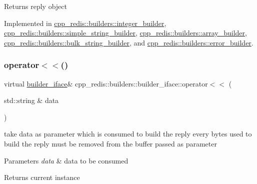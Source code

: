 \begin{DoxyReturn}{Returns}
reply object 
\end{DoxyReturn}


Implemented in \hyperlink{classcpp__redis_1_1builders_1_1integer__builder_a25221763ba6f8b740458c673945208e0}{cpp\+\_\+redis\+::builders\+::integer\+\_\+builder}, \hyperlink{classcpp__redis_1_1builders_1_1simple__string__builder_a24ad0968d7d02172a65cf8982c540d51}{cpp\+\_\+redis\+::builders\+::simple\+\_\+string\+\_\+builder}, \hyperlink{classcpp__redis_1_1builders_1_1array__builder_ac5c805ad87b357a9578c5a0d479109b3}{cpp\+\_\+redis\+::builders\+::array\+\_\+builder}, \hyperlink{classcpp__redis_1_1builders_1_1bulk__string__builder_a56d6d3089107a1bccd63f6a5267c16cb}{cpp\+\_\+redis\+::builders\+::bulk\+\_\+string\+\_\+builder}, and \hyperlink{classcpp__redis_1_1builders_1_1error__builder_ae2b68b7daad4d71b6780e47bdcc1e32b}{cpp\+\_\+redis\+::builders\+::error\+\_\+builder}.

\mbox{\label{classcpp__redis_1_1builders_1_1builder__iface_a9892bbc9c887c31c2742dad4476e2fa6}} 
\subsubsection{\texorpdfstring{operator$<$$<$()}{operator<<()}}
{\footnotesize\ttfamily virtual \hyperlink{classcpp__redis_1_1builders_1_1builder__iface}{builder\+\_\+iface}\& cpp\+\_\+redis\+::builders\+::builder\+\_\+iface\+::operator$<$$<$ (\begin{DoxyParamCaption}\item[{std\+::string \&}]{data }\end{DoxyParamCaption})\hspace{0.3cm}{\ttfamily [pure virtual]}}

take data as parameter which is consumed to build the reply every bytes used to build the reply must be removed from the buffer passed as parameter


\begin{DoxyParams}{Parameters}
{\em data} & data to be consumed \\
\hline
\end{DoxyParams}
\begin{DoxyReturn}{Returns}
current instance 
\end{DoxyReturn}


